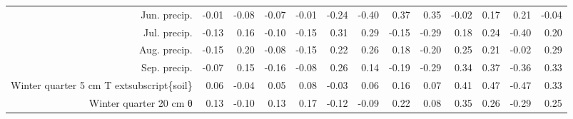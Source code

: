 \begin{table}[ht]
\begin{tabular}{rrrrrrrrrrrrr}
  Jun. precip. & -0.01 & -0.08 & -0.07 & -0.01 & -0.24 & -0.40 & 0.37 & 0.35 & -0.02 & 0.17 & 0.21 & -0.04 \\ 
  Jul. precip. & -0.13 & 0.16 & -0.10 & -0.15 & 0.31 & 0.29 & -0.15 & -0.29 & 0.18 & 0.24 & -0.40 & 0.20 \\ 
  Aug. precip. & -0.15 & 0.20 & -0.08 & -0.15 & 0.22 & 0.26 & 0.18 & -0.20 & 0.25 & 0.21 & -0.02 & 0.29 \\ 
  Sep. precip. & -0.07 & 0.15 & -0.16 & -0.08 & 0.26 & 0.14 & -0.19 & -0.29 & 0.34 & 0.37 & -0.36 & 0.33 \\ 
  Winter quarter 5 cm T	extsubscript\{soil\} & 0.06 & -0.04 & 0.05 & 0.08 & -0.03 & 0.06 & 0.16 & 0.07 & 0.41 & 0.47 & -0.47 & 0.33 \\ 
  Winter quarter 20 cm θ & 0.13 & -0.10 & 0.13 & 0.17 & -0.12 & -0.09 & 0.22 & 0.08 & 0.35 & 0.26 & -0.29 & 0.25 \\ 
   \hline
\end{tabular}
\end{table}
